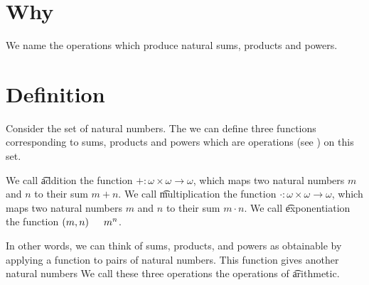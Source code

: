
\section*{Why}

We name the operations which produce natural sums, products and powers.

\section*{Definition}

Consider the set of natural numbers.
The we can define three functions corresponding to sums, products and powers which are operations (see ) on this set.

We call \t{addition} the function $+: \omega  \times \omega  \to \omega $, which maps two natural numbers $m$ and $n$ to their sum $m + n$.
We call \t{multiplication} the function $\cdot : \omega \times \omega  \to \omega $, which maps two natural numbers $m$ and $n$ to their sum $m \cdot  n$.
We call \t{exponentiation} the function $(m, n) \indent m^n$.

In other words, we can think of sums, products, and powers as obtainable by applying a function to pairs of natural numbers.
This function gives another natural numbers
We call these three operations the operations of \t{arithmetic}.

\blankpage